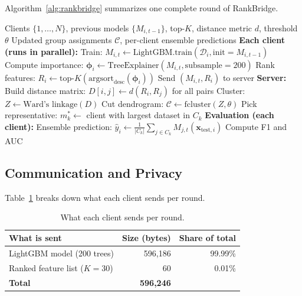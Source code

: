 \documentclass[12pt,a4paper]{article}
\begin{document}
Algorithm~\ref{alg:rankbridge} summarizes one complete round of RankBridge.

\begin{algorithm}[H]
\caption{RankBridge: One Federated Round}\label{alg:rankbridge}
\begin{algorithmic}[1]
\REQUIRE Clients $\{1, \ldots, N\}$, previous models $\{M_{i,t-1}\}$, top-$K$, distance metric $d$, threshold $\theta$
\ENSURE Updated group assignments $\mathcal{C}$, per-client ensemble predictions
\STATE \textbf{Each client (runs in parallel):}
  \STATE Train: $M_{i,t} \leftarrow \text{LightGBM.train}(\mathcal{D}_i, \text{init} = M_{i,t-1})$
  \STATE Compute importance: $\boldsymbol{\phi}_i \leftarrow \text{TreeExplainer}(M_{i,t}, \text{subsample}=200)$
  \STATE Rank features: $R_i \leftarrow \text{top-}K(\text{argsort}_\text{desc}(\boldsymbol{\phi}_i))$
  \STATE Send $(M_{i,t}, R_i)$ to server
\ENDFOR
\STATE \textbf{Server:}
\STATE Build distance matrix: $D[i,j] \leftarrow d(R_i, R_j)$ for all pairs
\STATE Cluster: $Z \leftarrow \text{Ward's linkage}(D)$
\STATE Cut dendrogram: $\mathcal{C} \leftarrow \text{fcluster}(Z, \theta)$
  \STATE Pick representative: $m_k^* \leftarrow$ client with largest dataset in $C_k$
\ENDFOR
\STATE \textbf{Evaluation (each client):}
  \STATE Ensemble prediction: $\hat{y}_i \leftarrow \frac{1}{|C_k|} \sum_{j \in C_k} M_{j,t}(\mathbf{x}_{\text{test},i})$
  \STATE Compute F1 and AUC
\ENDFOR
\end{algorithmic}
\end{algorithm}

\subsection{Communication and Privacy}

Table~\ref{tab:communication} breaks down what each client sends per round.

\begin{table}[H]
\centering
\caption{What each client sends per round.}\label{tab:communication}
\begin{tabular}{lrr}
\toprule
\textbf{What is sent} & \textbf{Size (bytes)} & \textbf{Share of total} \\
\midrule
LightGBM model (200 trees) & 596{,}186 & 99.99\% \\
Ranked feature list ($K=30$) & 60 & 0.01\% \\
\midrule
\textbf{Total} & \textbf{596{,}246} & \\
\bottomrule
\end{tabular}
\end{table}
\end{document}
